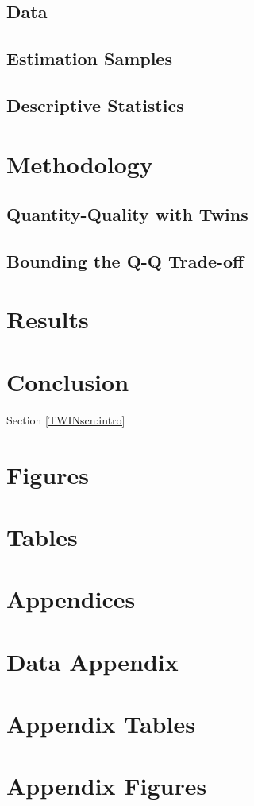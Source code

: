 \documentclass{article}[11pt,subeqn]
\begin{document}
\begin{spacing}{1.4}
\subsection{Data}                                  \label{TWINsscn:data}
\subsection{Estimation Samples}                    \label{TWINsscn:samples}
\subsection{Descriptive Statistics}                \label{TWINsscn:descriptives}
\section{Methodology}                              \label{TWINscn:method}
\subsection{Quantity-Quality with Twins}           \label{TWINsscn:methodQQ}
\subsection{Bounding the Q-Q Trade-off}            \label{TWINsscn:methodBounds}
\section{Results}                                  \label{TWINscn:results}
\section{Conclusion}                               \label{TWINscn:conclusion}

Section \ref{TWINscn:intro}
\newpage
\section*{Figures}


\clearpage
\section*{Tables}

\clearpage




\newpage
\appendix
\section*{Appendices}
\section{Data Appendix}
\section{Appendix Tables}
\section{Appendix Figures}




\end{spacing}
\end{document}
